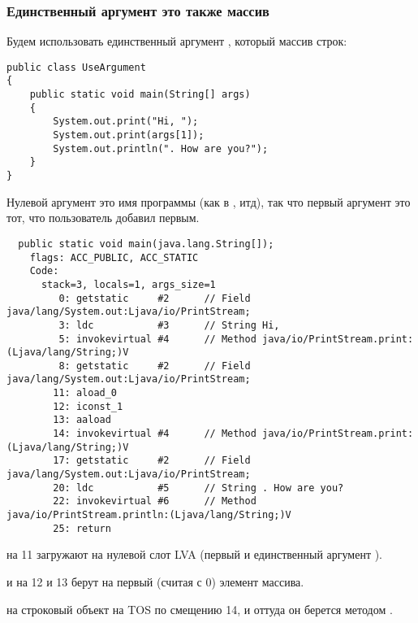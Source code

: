 \subsubsection{Единственный аргумент \main это также массив}


Будем использовать единственный аргумент \main, который массив строк:

\begin{lstlisting}[style=customjava]
public class UseArgument
{
	public static void main(String[] args)
	{
		System.out.print("Hi, ");
		System.out.print(args[1]);
		System.out.println(". How are you?");
	}
}
\end{lstlisting}


Нулевой аргумент это имя программы (как в \CCpp, итд),
так что первый аргумент это тот, что пользователь добавил первым.

\begin{lstlisting}
  public static void main(java.lang.String[]);
    flags: ACC_PUBLIC, ACC_STATIC
    Code:
      stack=3, locals=1, args_size=1
         0: getstatic     #2      // Field java/lang/System.out:Ljava/io/PrintStream;
         3: ldc           #3      // String Hi, 
         5: invokevirtual #4      // Method java/io/PrintStream.print:(Ljava/lang/String;)V
         8: getstatic     #2      // Field java/lang/System.out:Ljava/io/PrintStream;
        11: aload_0       
        12: iconst_1      
        13: aaload        
        14: invokevirtual #4      // Method java/io/PrintStream.print:(Ljava/lang/String;)V
        17: getstatic     #2      // Field java/lang/System.out:Ljava/io/PrintStream;
        20: ldc           #5      // String . How are you?
        22: invokevirtual #6      // Method java/io/PrintStream.println:(Ljava/lang/String;)V
        25: return        
\end{lstlisting}


 на 11 загружают  на нулевой слот \ac{LVA} 
(первый и единственный аргумент \main).

 и  на 12 и 13 берут  на первый (считая с 0) 
элемент массива.

 на строковый объект на \ac{TOS} по смещению 14, и оттуда он 
берется методом .
